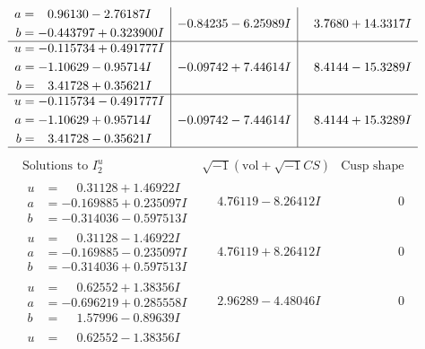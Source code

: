 \documentclass[1p]{elsarticle_modified}
\theoremstyle{definition}
\newcommand{\I}{\sqrt{-1}}
\begin{document}
$$\begin{array}{c|c|c}
\begin{aligned}
a &= \phantom{-}0.96130 - 2.76187 I \\
b &= -0.443797 + 0.323900 I\end{aligned}
 & -0.84235 - 6.25989 I & \phantom{-}3.7680 + 14.3317 I \\ \hline\begin{aligned}
u &= -0.115734 + 0.491777 I \\
a &= -1.10629 - 0.95714 I \\
b &= \phantom{-}3.41728 + 0.35621 I\end{aligned}
 & -0.09742 + 7.44614 I & \phantom{-}8.4144 - 15.3289 I \\ \hline\begin{aligned}
u &= -0.115734 - 0.491777 I \\
a &= -1.10629 + 0.95714 I \\
b &= \phantom{-}3.41728 - 0.35621 I\end{aligned}
 & -0.09742 - 7.44614 I & \phantom{-}8.4144 + 15.3289 I\\
 \hline 
 \end{array}$$\newpage$$\begin{array}{c|c|c}  
\text{Solutions to }I^u_{2}& \I (\text{vol} + \sqrt{-1}CS) & \text{Cusp shape}\\
 \hline 
\begin{aligned}
u &= \phantom{-}0.31128 + 1.46922 I \\
a &= -0.169885 + 0.235097 I \\
b &= -0.314036 - 0.597513 I\end{aligned}
 & \phantom{-}4.76119 - 8.26412 I & \phantom{-0.000000 } 0 \\ \hline\begin{aligned}
u &= \phantom{-}0.31128 - 1.46922 I \\
a &= -0.169885 - 0.235097 I \\
b &= -0.314036 + 0.597513 I\end{aligned}
 & \phantom{-}4.76119 + 8.26412 I & \phantom{-0.000000 } 0 \\ \hline\begin{aligned}
u &= \phantom{-}0.62552 + 1.38356 I \\
a &= -0.696219 + 0.285558 I \\
b &= \phantom{-}1.57996 - 0.89639 I\end{aligned}
 & \phantom{-}2.96289 - 4.48046 I & \phantom{-0.000000 } 0 \\ \hline\begin{aligned}
u &= \phantom{-}0.62552 - 1.38356 I \\

\end{aligned}
\end{array}$$
\end{document}
